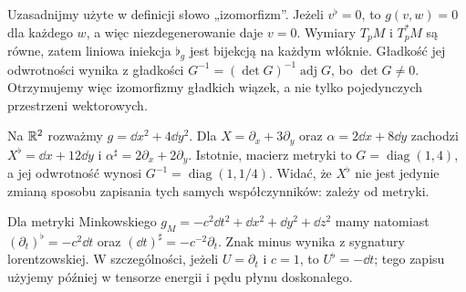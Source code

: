 Uzasadnijmy użyte w definicji słowo „izomorfizm”.
Jeżeli $v^\flat=0$, to $g(v,w)=0$ dla każdego $w$,
a więc niezdegenerowanie daje $v=0$.
Wymiary $T_pM$ i $T_p^*M$ są równe, zatem liniowa
iniekcja $\flat_g$ jest bijekcją na każdym włóknie.
Gładkość jej odwrotności wynika z gładkości
$G^{-1}=(\det G)^{-1}\operatorname{adj}G$, bo $\det G\ne0$.
Otrzymujemy więc izomorfizmy gładkich wiązek,
a nie tylko pojedynczych przestrzeni wektorowych.

\begin{przyklad}
\label{prz:izomorfizmy-muzyczne}
Na $\mathbb{R}^2$ rozważmy $g=\dd x^2+4\dd y^2$.
Dla $X=\partial_x+3\partial_y$ oraz
$\alpha=2\dd x+8\dd y$ zachodzi
$X^\flat=\dd x+12\dd y$ i
$\alpha^\sharp=2\partial_x+2\partial_y$.
Istotnie, macierz metryki to $G=\operatorname{diag}(1,4)$,
a jej odwrotność wynosi $G^{-1}=\operatorname{diag}(1,1/4)$.
Widać, że $X^\flat$ nie jest jedynie zmianą sposobu
zapisania tych samych współczynników: zależy od metryki.

Dla metryki Minkowskiego
$g_M=-c^2\dd t^2+\dd x^2+\dd y^2+\dd z^2$ mamy natomiast
$(\partial_t)^\flat=-c^2\dd t$ oraz
$(\dd t)^\sharp=-c^{-2}\partial_t$.
Znak minus wynika z sygnatury lorentzowskiej.
W szczególności, jeżeli $U=\partial_t$ i $c=1$,
to $U^\flat=-\dd t$; tego zapisu użyjemy
później w tensorze energii i pędu płynu doskonałego.
\end{przyklad}


